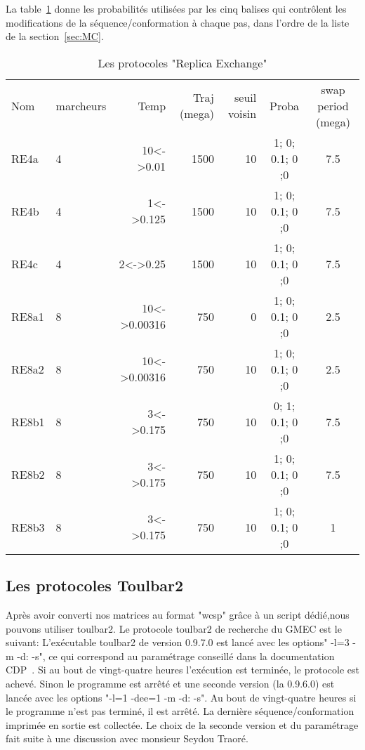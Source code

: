 La table~\ref{tab:protoRE} donne les probabilités utilisées par les cinq balises qui contrôlent les modifications de la séquence/conformation à chaque pas, dans l'ordre de la liste de la section~\ref{sec:MC}. 
    
    \begin{table}[!htbp]
      \centering

      \begin{tabular}{llrrrcc}

        \toprule
        Nom & marcheurs &Temp & Traj (mega)& seuil voisin  & Proba & swap period (mega)\\
        \cmidrule{1-7}
        RE4a   & 4 & 10<->0.01    &  1500 & 10 & 1; 0; 0.1; 0 ;0 &  7.5\\  
        RE4b   & 4 & 1<->0.125    &  1500 & 10 & 1; 0; 0.1; 0 ;0 &  7.5\\  
        RE4c   & 4 & 2<->0.25     &  1500 & 10 & 1; 0; 0.1; 0 ;0 &  7.5\\  
        RE8a1  & 8 & 10<->0.00316 &  750  & 0  & 1; 0; 0.1; 0 ;0 &  2.5\\  
        RE8a2  & 8 & 10<->0.00316 &  750  & 10 & 1; 0; 0.1; 0 ;0 &  2.5\\  
        RE8b1  & 8 & 3<->0.175    &  750  & 10 & 0; 1; 0.1; 0 ;0 &  7.5\\
        RE8b2  & 8 & 3<->0.175    &  750  & 10 & 1; 0; 0.1; 0 ;0 &  7.5\\
        RE8b3  & 8 & 3<->0.175    &  750  & 10 & 1; 0; 0.1; 0 ;0 &  1\\
        \bottomrule

      \end{tabular}      
      \caption{Les protocoles "Replica Exchange"}
\label{tab:protoRE}      
    \end{table}

   \subsection{Les protocoles Toulbar2} 
\label{proto_toulbar2}

Après avoir converti nos matrices au format "wcsp" grâce à un script dédié,nous pouvons utiliser toulbar2.
Le protocole toulbar2 de recherche du GMEC est le suivant:
L'exécutable toulbar2 de version 0.9.7.0 est lancé avec les options" -l=3 -m -d: -s", ce qui correspond au paramétrage conseillé dans la documentation CDP~\citep{reftoulbar1,reftoulbar2}. Si au bout de vingt-quatre heures l'exécution est terminée, le protocole est achevé. Sinon le programme est arrêté et une seconde version (la 0.9.6.0) est lancée avec les options "-l=1 -dee=1 -m -d: -s". Au bout de vingt-quatre heures si le programme n'est pas terminé, il est arrêté. La dernière séquence/conformation imprimée en sortie est collectée. Le choix de la seconde version et du paramétrage fait suite à une discussion avec monsieur Seydou Traoré.  

